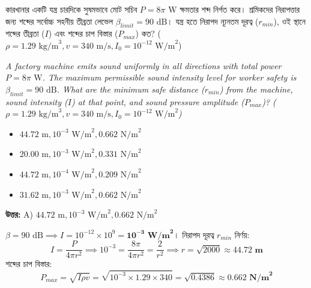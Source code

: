 \documentclass[12pt, a4paper]{article}
\begin{document}
\vspace{2em}

\begin{tcolorbox}[questionbox={প্রশ্ন (Question) 25}]
    \noindent
    কারখানার একটি যন্ত্র চারদিকে সুষমভাবে মোট সচিব $P = 8\pi\text{ W}$ ক্ষমতার শব্দ নির্গত করে। শ্রমিকদের নিরাপত্তার জন্য শব্দের সর্বোচ্চ সহনীয় তীব্রতা লেভেল $\beta_{limit} = 90\text{ dB}$। যন্ত্র হতে নিরাপদ ন্যূনতম দূরত্ব ($r_{min}$), ওই স্থানে শব্দের তীব্রতা ($I$) এবং শব্দের চাপ বিস্তার ($P_{max}$) কত? ($\rho = 1.29\text{ kg/m}^3, v = 340\text{ m/s}, I_0 = 10^{-12}\text{ W/m}^2$)
    
    \vspace{0.8em}
    \begin{english}
    \noindent\textit{\color{darkgray}
    A factory machine emits sound uniformly in all directions with total power $P = 8\pi\text{ W}$. The maximum permissible sound intensity level for worker safety is $\beta_{limit} = 90\text{ dB}$. What are the minimum safe distance ($r_{min}$) from the machine, sound intensity ($I$) at that point, and sound pressure amplitude ($P_{max}$)? ($\rho = 1.29\text{ kg/m}^3, v = 340\text{ m/s}, I_0 = 10^{-12}\text{ W/m}^2$)
    }
    \end{english}
\end{tcolorbox}

\begin{itemize}[label={}, leftmargin=1cm, itemsep=0.5em]
    \item[\textbf{A)}] $44.72\text{ m}, 10^{-3}\text{ W/m}^2, 0.662\text{ N/m}^2$
    \item[\textbf{B)}] $20.00\text{ m}, 10^{-3}\text{ W/m}^2, 0.331\text{ N/m}^2$
    \item[\textbf{C)}] $44.72\text{ m}, 10^{-4}\text{ W/m}^2, 0.209\text{ N/m}^2$
    \item[\textbf{D)}] $31.62\text{ m}, 10^{-3}\text{ W/m}^2, 0.662\text{ N/m}^2$
\end{itemize}

\vspace{0.5em}
\begin{tcolorbox}[answerbox]
    \textbf{\color{success} উত্তর:} A) $44.72\text{ m}, 10^{-3}\text{ W/m}^2, 0.662\text{ N/m}^2$
\end{tcolorbox}
\vspace{1em}

\begin{tcolorbox}[solutionbox={সমাধান (Solution)}]
    \noindent
    $\beta = 90\text{ dB} \implies I = 10^{-12} \times 10^9 = \mathbf{10^{-3}\text{ W/m}^2}$। নিরাপদ দূরত্ব $r_{min}$ নির্ণয়:
    \[ I = \frac{P}{4\pi r^2} \implies 10^{-3} = \frac{8\pi}{4\pi r^2} = \frac{2}{r^2} \implies r = \sqrt{2000} \approx \mathbf{44.72\text{ m}} \]
    শব্দের চাপ বিস্তার:
    \[ P_{max} = \sqrt{I \rho v} = \sqrt{10^{-3} \times 1.29 \times 340} = \sqrt{0.4386} \approx \mathbf{0.662\text{ N/m}^2} \]
\end{tcolorbox}
\end{document}
